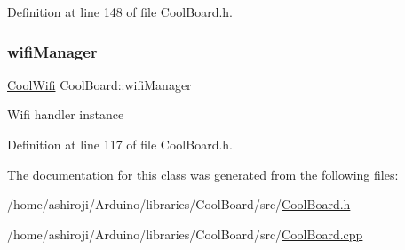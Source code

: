 Definition at line 148 of file Cool\+Board.\+h.

\mbox{\label{class_cool_board_acd88e6003606b47479ebba81e4aceeca}} 
\subsubsection{\texorpdfstring{wifi\+Manager}{wifiManager}}
{\footnotesize\ttfamily \hyperlink{class_cool_wifi}{Cool\+Wifi} Cool\+Board\+::wifi\+Manager\hspace{0.3cm}{\ttfamily [private]}}

Wifi handler instance 

Definition at line 117 of file Cool\+Board.\+h.



The documentation for this class was generated from the following files\+:\begin{DoxyCompactItemize}
\item 
/home/ashiroji/\+Arduino/libraries/\+Cool\+Board/src/\hyperlink{_cool_board_8h}{Cool\+Board.\+h}\item 
/home/ashiroji/\+Arduino/libraries/\+Cool\+Board/src/\hyperlink{_cool_board_8cpp}{Cool\+Board.\+cpp}\end{DoxyCompactItemize}
